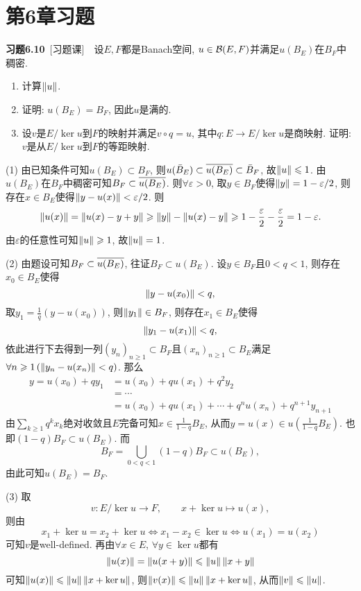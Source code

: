 	\section{第6章习题}	
	\textbf{习题6.10}\ [习题课]\ \ 设$ E, F $都是Banach空间, $ u\in\CB(E,F) $并满足$ u(B_E) $在$ B_F $中稠密.
	\begin{enumerate}[(1)]
	\item 计算$ \norm{u} $.
	\item 证明: $ u(B_E)=B_F $, 因此$ u $是满的.
	\item 设$ v $是$ E/\ker u $到$ F $的映射并满足$ v\circ q=u $, 其中$ q : E\to E/\ker u $是商映射. 证明: $ v $是从$ E/\ker u $到$ F $的等距映射.
	\end{enumerate}
	\begin{Proof}
	(1) 由已知条件可知$ u(B_E)\subset B_F $, 则$ u(\bar{B}_E)\subset\baro{u(B_E)}\subset \bar{B}_F $, 故$ \norm{u}\leqslant 1 $. 由$ u(B_E) $在$ B_F $中稠密可知$ B_F\subset\baro{u(B_E)} $. 则$ \forall\varepsilon>0 $, 取$ y\in B_F $使得$ \norm{y}=1-\varepsilon/2 $, 则存在$ x\in B_E $使得$ \norm{y-u(x)}<\varepsilon/2 $. 则
	\[
	\norm{u(x)}=\norm{u(x)-y+y}\geqslant\norm{y}-\norm{u(x)-y}\geqslant 1-\frac{\varepsilon}{2}-\frac{\varepsilon}{2}=1-\varepsilon.
	\]
	由$ \varepsilon $的任意性可知$ \norm{u}\geqslant 1 $, 故$ \norm{u}=1 $.
	
	(2) 由题设可知$ B_F\subset\baro{u(B_E)} $, 往证$ B_F\subset u(B_E) $. 设$ y\in B_F $且$ 0<q<1 $, 则存在$ x_0\in B_E $使得
	\[
	\norm{y-u(x_0)}<q,
	\]
	取$ y_1=\frac{1}{q}(y-u(x_0)) $, 则$ \norm{y_1}\in B_F $, 则存在$ x_1\in B_E $使得
	\[
	\norm{y_1-u(x_1)}<q,
	\]
	依此进行下去得到一列$ (y_n)_{n\geqslant 1}\subset B_F $且$ (x_n)_{n\geqslant 1}\subset B_E $满足$ \forall n\geqslant 1\,(\norm{y_n-u(x_n)}<q) $. 那么
	\[
	\begin{aligned}
	y=u(x_0)+qy_1&=u(x_0)+qu(x_1)+q^2y_2\\
	&=\cdots\\
	&=u(x_0)+qu(x_1)+\cdots+q^nu(x_n)+q^{n+1}y_{n+1}
	\end{aligned}
	\]
	由$ \sum\limits_{k\geqslant 1}q^kx_k $绝对收敛且$ E $完备可知$ x\in\frac{1}{1-q}B_E $, 从而$ y=u(x)\in u\left( \frac{1}{1-q}B_E \right) $. 也即$ (1-q)B_F\subset u(B_E) $. 而
	\[
	B_F=\bigcup_{0<q<1}(1-q)B_F\subset u(B_E),
	\]
	由此可知$ u(B_E)=B_F $.
	
	(3) 取
	\[
	v : E/\ker u\to F,\qquad x+\ker u\mapsto u(x),
	\]
	则由
	\[
	x_1+\ker u=x_2+\ker u\Longleftrightarrow x_1-x_2\in\ker u\Longleftrightarrow u(x_1)=u(x_2)
	\]
	可知$ v $是well-defined. 再由$ \forall x\in E $, $ \forall y\in\ker u $都有
	\[
	\norm{u(x)}=\norm{u(x+y)}\leqslant\norm{u}\norm{x+y}
	\]
	可知$ \norm{u(x)}\leqslant\norm{u}\norm{x+\ker u} $, 则$ \norm{v(x)}\leqslant\norm{u}\norm{x+\ker u} $, 从而$ \norm{v}\leqslant\norm{u} $.
	

\end{Proof}
